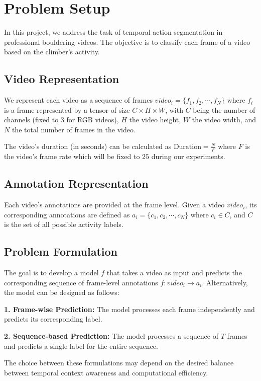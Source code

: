 \section{Problem Setup}

In this project, we address the task of temporal action segmentation in professional bouldering videos. The objective is to classify each frame of a video based on the climber's activity.

\subsection{Video Representation}
We represent each video as a sequence of frames $video_i = \{f_1, f_2, \cdots, f_N\}$ where $f_i$ is a frame represented by a tensor of size $C \times H \times W$, with $C$ being the number of channels (fixed to 3 for RGB videos), $H$ the video height, $W$ the video width, and $N$ the total number of frames in the video.

The video's duration (in seconds) can be calculated as $\text{Duration} = \frac{N}{F}$ where $F$ is the video's frame rate which will be fixed to $25$ during our experiments.

\subsection{Annotation Representation}
Each video's annotations are provided at the frame level. Given a video $video_i$, its corresponding annotations are defined as $a_i = \{c_1, c_2, \cdots, c_N\}$ where $c_i \in C$, and $C$ is the set of all possible activity labels.

\subsection{Problem Formulation}
The goal is to develop a model $f$ that takes a video as input and predicts the corresponding sequence of frame-level annotations $f : video_i \rightarrow a_i$. Alternatively, the model can be designed as follows:

\textbf{1. Frame-wise Prediction:} The model processes each frame independently and predicts its corresponding label.

\textbf{2. Sequence-based Prediction:} The model processes a sequence of $T$ frames and predicts a single label for the entire sequence.

The choice between these formulations may depend on the desired balance between temporal context awareness and computational efficiency.

